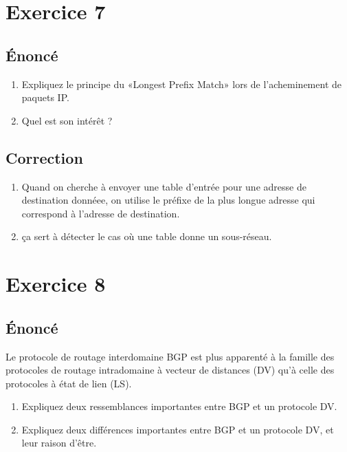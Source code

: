 \documentclass[a4paper, 11pt, titlepage]{article}
\begin{document}
\section{Exercice 7}
\subsection{\'Enoncé}
\begin{enumerate}[label=(\alph*)]
  \item Expliquez le principe du «Longest Prefix Match» lors de l’acheminement de paquets IP.
  \item Quel est son intérêt ?
\end{enumerate}

\subsection{Correction}
\begin{enumerate}[label=(\alph*)]
\item
Quand on cherche à envoyer une table d'entrée pour une adresse de destination donnéee, on utilise le préfixe de la plus longue adresse qui correspond à l'adresse de destination.

\item 
ça sert à détecter le cas où une table donne un sous-réseau.


\end{enumerate}


\section{Exercice 8}
\subsection{\'Enoncé}
Le protocole de routage interdomaine BGP est plus apparenté à la famille des protocoles de routage intradomaine à vecteur de distances (DV) qu’à celle des protocoles à état de lien (LS).
\begin{enumerate}[label=(\alph*)]
  \item Expliquez deux ressemblances importantes entre BGP et un protocole DV.
  \item Expliquez deux différences importantes entre BGP et un protocole DV, et leur raison d’être.
\end{enumerate}
\end{document}
